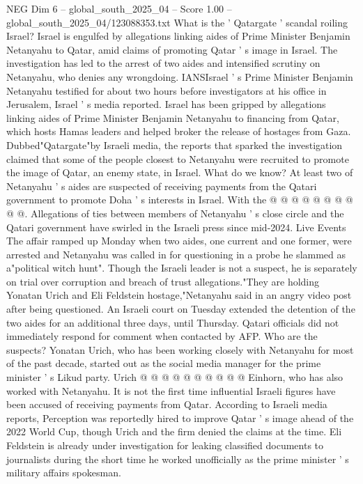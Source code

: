 \begin{textsample}{NEG Dim 6 – global\_south\_2025\_04 – Score 1.00 – global\_south\_2025\_04/123088353.txt}  \label{ex:f6_neg_213}
What is the ' Qatargate ' scandal roiling Israel?
Israel is engulfed by allegations linking aides of Prime Minister Benjamin Netanyahu to Qatar, amid claims of promoting Qatar ' s image in Israel.
The investigation has led to the arrest of two aides and intensified scrutiny on Netanyahu, who denies any wrongdoing.
IANSIsrael ' s Prime Minister Benjamin Netanyahu testified for about two hours before investigators at his office in Jerusalem, Israel ' s media reported.
Israel has been gripped by allegations linking aides of Prime Minister Benjamin Netanyahu to financing from Qatar, which hosts Hamas leaders and helped broker the release of hostages from Gaza.
Dubbed"Qatargate"by Israeli media, the reports that sparked the investigation claimed that some of the people closest to Netanyahu were recruited to promote the image of Qatar, an enemy state, in Israel.
What do we know?
At least two of Netanyahu ' s aides are suspected of receiving payments from the Qatari government to promote Doha ' s interests in Israel.
With the @ @ @ @ @ @ @ @ @ @.
Allegations of ties between members of Netanyahu ' s close circle and the Qatari government have swirled in the Israeli press since mid-2024.
Live Events The affair ramped up Monday when two aides, one current and one former, were arrested and Netanyahu was called in for questioning in a probe he slammed as a"political witch hunt".
Though the Israeli leader is not a suspect, he is separately on trial over corruption and breach of trust allegations."They are holding Yonatan Urich and Eli Feldstein hostage,"Netanyahu said in an angry video post after being questioned.
An Israeli court on Tuesday extended the detention of the two aides for an additional three days, until Thursday.
Qatari officials did not immediately respond for comment when contacted by AFP.
Who are the suspects?
Yonatan Urich, who has been working closely with Netanyahu for most of the past decade, started out as the social media manager for the prime minister ' s Likud party.
Urich @ @ @ @ @ @ @ @ @ @ Einhorn, who has also worked with Netanyahu.
It is not the first time influential Israeli figures have been accused of receiving payments from Qatar.
According to Israeli media reports, Perception was reportedly hired to improve Qatar ' s image ahead of the 2022 World Cup, though Urich and the firm denied the claims at the time.
Eli Feldstein is already under investigation for leaking classified documents to journalists during the short time he worked unofficially as the prime minister ' s military affairs spokesman.

\end{textsample}
